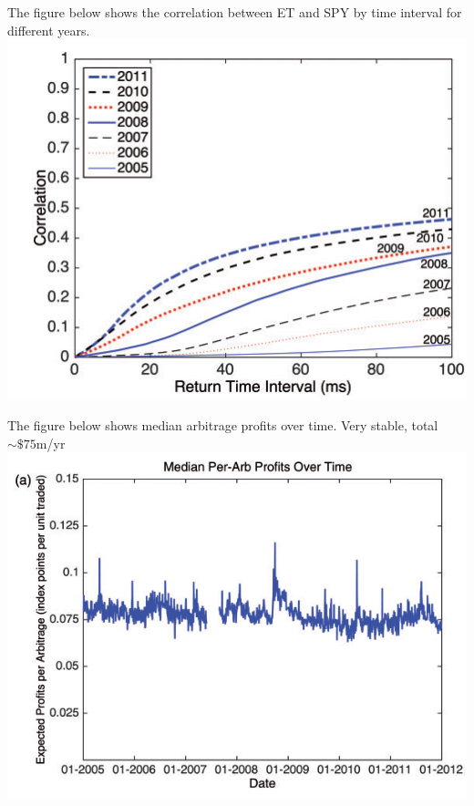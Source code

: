 \documentclass[english,10pt
,aspectratio=169
]{beamer}
\begin{document}
\begin{frame}[noframenumbering]{\citet*{budish_high-frequency_2015}}
	The figure below shows the correlation between ET and SPY by time interval for different years.
	\center
	\includegraphics[scale=0.7]{pics/HTF_Corr_Time}
\end{frame}


\begin{frame}{\citet*{budish_high-frequency_2015}}
	The figure below shows median arbitrage profits over time. Very stable, total $\sim \$75$m/yr
	\center
	\includegraphics[scale=0.7]{pics/HTF_ArbitrageProfitsTime}
\end{frame}
\end{document}

